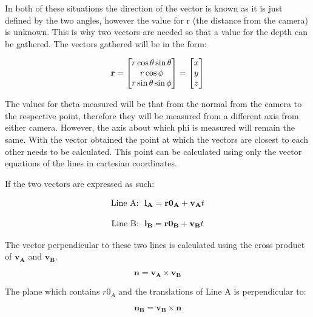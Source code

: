 \documentclass{article}
\begin{document}
In both of these situations the direction of the vector is known as it is just defined by the two angles, however the value for r (the distance from the camera) is unknown. This is why two vectors are needed so that a value for the depth can be gathered. The vectors gathered will be in the form:

\begin{equation}
	\bf{r} = \begin{bmatrix} r \cos{\theta} \sin{\theta} \\  r \cos{\phi} \\  r \sin{\theta} \sin{\phi} \end{bmatrix} = \begin{bmatrix}
		x \\ y \\ z
	\end{bmatrix}
\end{equation}

The values for theta measured will be that from the normal from the camera to the respective point, therefore they will be measured from a different axis from either camera. However, the axis about which phi is measured will remain the same. With the vector obtained the point at which the vectors are closest to each other needs to be calculated. This point can be calculated using only the vector equations of the lines in cartesian coordinates.

If the two vectors are expressed as such:

\begin{equation}
	\textnormal{Line A: } \ \mathbf{l_A}=\mathbf{r0_A}+\mathbf{v_A} t 
\end{equation}

\begin{equation}
	\textnormal{Line B: } \ \mathbf{l_B}=\mathbf{r0_B}+\mathbf{v_B} t
\end{equation}

The vector perpendicular to these two lines is calculated using the cross product of $\mathbf{v_A}$ and $\mathbf{v_B}$.

\begin{equation}
	\mathbf{n}= \mathbf{v_A} \times \mathbf{v_B}
\end{equation}


The plane which contains $r0_A$ and the translations of Line A is perpendicular to: 

\begin{equation}
	\mathbf{n_B}= \mathbf{v_B} \times \mathbf{n}
\end{equation}
\end{document}
